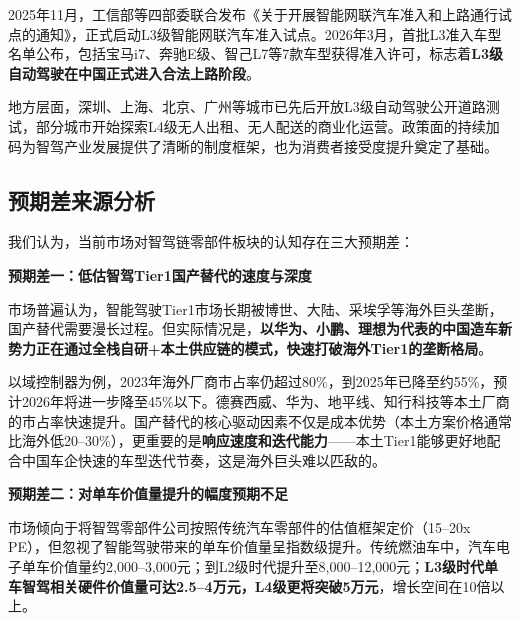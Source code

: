 2025年11月，工信部等四部委联合发布《关于开展智能网联汽车准入和上路通行试点的通知》，正式启动L3级智能网联汽车准入试点。2026年3月，首批L3准入车型名单公布，包括宝马i7、奔驰E级、智己L7等7款车型获得准入许可，标志着\textbf{L3级自动驾驶在中国正式进入合法上路阶段}。

地方层面，深圳、上海、北京、广州等城市已先后开放L3级自动驾驶公开道路测试，部分城市开始探索L4级无人出租、无人配送的商业化运营。政策面的持续加码为智驾产业发展提供了清晰的制度框架，也为消费者接受度提升奠定了基础。

\subsection{预期差来源分析}

我们认为，当前市场对智驾链零部件板块的认知存在三大预期差：

\textbf{预期差一：低估智驾Tier1国产替代的速度与深度}

市场普遍认为，智能驾驶Tier1市场长期被博世、大陆、采埃孚等海外巨头垄断，国产替代需要漫长过程。但实际情况是，\textbf{以华为、小鹏、理想为代表的中国造车新势力正在通过全栈自研+本土供应链的模式，快速打破海外Tier1的垄断格局}。

以域控制器为例，2023年海外厂商市占率仍超过80\%，到2025年已降至约55\%，预计2026年将进一步降至45\%以下。德赛西威、华为、地平线、知行科技等本土厂商的市占率快速提升。国产替代的核心驱动因素不仅是成本优势（本土方案价格通常比海外低20--30\%），更重要的是\textbf{响应速度和迭代能力}——本土Tier1能够更好地配合中国车企快速的车型迭代节奏，这是海外巨头难以匹敌的。

\textbf{预期差二：对单车价值量提升的幅度预期不足}

市场倾向于将智驾零部件公司按照传统汽车零部件的估值框架定价（15--20x PE），但忽视了智能驾驶带来的单车价值量呈指数级提升。传统燃油车中，汽车电子单车价值量约2,000--3,000元；到L2级时代提升至8,000--12,000元；\textbf{L3级时代单车智驾相关硬件价值量可达2.5--4万元，L4级更将突破5万元}，增长空间在10倍以上。

\begin{exhibitbox}[图表5-2：不同级别自动驾驶对应单车智驾价值量对比]
\centering
\vspace{0.3cm}
\vspace{0.2cm}
\end{exhibitbox}

